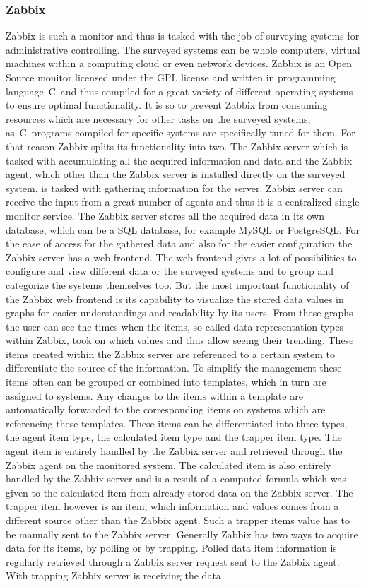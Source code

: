 \subsubsection{Zabbix}
	Zabbix is such a monitor and thus is tasked with the job of surveying systems for administrative controlling. The surveyed systems can be whole computers, virtual machines within a computing cloud or even network devices. Zabbix is an Open Source monitor licensed under the GPL license and written in programming language\ C\ and thus compiled for a great variety of different operating systems to ensure optimal functionality. It is so to prevent Zabbix from consuming resources which are necessary for other tasks on the surveyed systems, as\ C\ programs compiled for specific systems are specifically tuned for them. For that reason Zabbix splits its functionality into two. The Zabbix server which is tasked with accumulating all the acquired information and data and the Zabbix agent, which other than the Zabbix server is installed directly on the surveyed system, is tasked with gathering information for the server. Zabbix server can receive the input from a great number of agents and thus it is a centralized single monitor service. The Zabbix server stores all the acquired data in its own database, which can be a SQL database, for example MySQL or PostgreSQL. For the ease of access for the gathered data and also for the easier configuration the Zabbix server has a web frontend. The web frontend gives a lot of possibilities to configure and view different data or the surveyed systems and to group and categorize the systems themselves too. But the most important functionality of the Zabbix web frontend is its capability to visualize the stored data values in graphs for easier understandings and readability by its users. From these graphs the user can see the times when the items, so called data representation types within Zabbix, took on which values and thus allow seeing their trending. These items created within the Zabbix server are referenced to a certain system to differentiate the source of the information. To simplify the management these items often can be grouped or combined into templates, which in turn are assigned to systems. Any changes to the items within a template are automatically forwarded to the corresponding items on systems which are referencing these templates. These items can be differentiated into three types, the agent item type, the calculated item type and the trapper item type. The agent item is entirely handled by the Zabbix server and retrieved through the Zabbix agent on the monitored system. The calculated item is also entirely handled by the Zabbix server and is a result of a computed formula which was given to the calculated item from already stored data on the Zabbix server. The trapper item however is an item, which information and values comes from a different source other than the Zabbix agent. Such a trapper items value has to be manually sent to the Zabbix server. Generally Zabbix has two ways to acquire data for its items, by polling or by trapping. Polled data item information is regularly retrieved through a Zabbix server request sent to the Zabbix agent. With trapping Zabbix server is receiving the data 